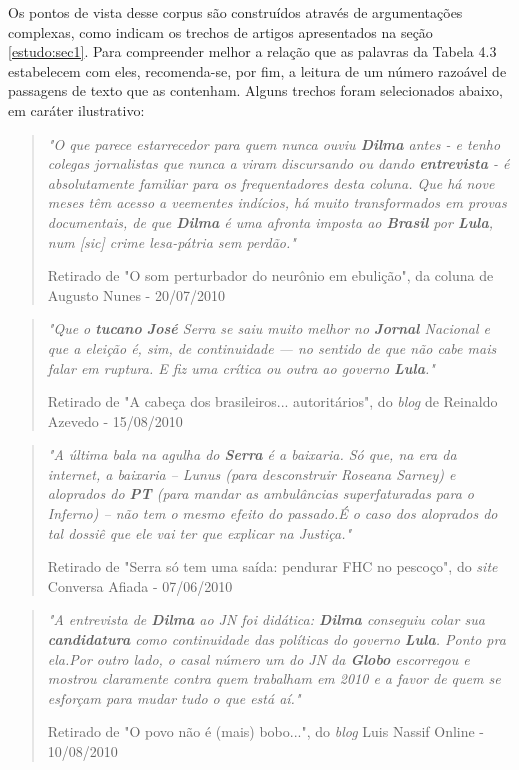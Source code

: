 Os pontos de vista desse corpus são construídos através de argumentações complexas, como indicam os trechos de artigos apresentados na seção \ref{estudo:sec1}. Para compreender melhor a relação que as palavras da Tabela 4.3 estabelecem com eles, recomenda-se, por fim, a leitura de um número razoável de passagens de texto que as contenham. Alguns trechos foram selecionados abaixo, em caráter ilustrativo:

\begin{quote}
\emph{"O que parece estarrecedor para quem nunca ouviu \textbf{Dilma} antes - e tenho colegas jornalistas que nunca a viram discursando ou dando \textbf{entrevista} - é absolutamente familiar para os frequentadores desta coluna. Que há nove meses têm acesso a veementes indícios, há muito transformados em provas documentais, de que \textbf{Dilma} é uma afronta imposta ao \textbf{Brasil} por \textbf{Lula}, num [sic] crime lesa-pátria sem perdão."}

{\small Retirado de "O som perturbador do neurônio em ebulição", da coluna de Augusto Nunes - 20/07/2010}
\end{quote}

\begin{quote}
\emph{"Que o \textbf{tucano} \textbf{José} Serra se saiu muito melhor no \textbf{Jornal} Nacional e que a eleição é, sim, de continuidade — no sentido de que não cabe mais falar em ruptura. E fiz uma crítica ou outra ao governo \textbf{Lula}."}

{\small Retirado de "A cabeça dos brasileiros... autoritários", do \emph{blog} de Reinaldo Azevedo - 15/08/2010}
\end{quote}

\begin{quote}

\emph{"A última bala na agulha do \textbf{Serra} é a baixaria. Só que, na era da internet, a baixaria – Lunus (para desconstruir Roseana Sarney) e aloprados do \textbf{PT} (para mandar as ambulâncias superfaturadas para o Inferno) – não tem o mesmo efeito do passado.É o caso dos aloprados do tal dossiê que ele vai ter que explicar na Justiça."}

{\small Retirado de "Serra só tem uma saída: pendurar FHC no pescoço", do \emph{site} Conversa Afiada - 07/06/2010}
\end{quote}

\begin{quote}
\emph{"A entrevista de \textbf{Dilma} ao JN foi didática: \textbf{Dilma} conseguiu colar sua \textbf{candidatura} como continuidade das políticas do governo \textbf{Lula}. Ponto pra ela.Por outro lado, o casal número um do JN da \textbf{Globo} escorregou e mostrou claramente contra quem trabalham em 2010 e a favor de quem se esforçam para mudar tudo o que está aí."}

{\small Retirado de "O povo não é (mais) bobo...", do \emph{blog} Luis Nassif Online - 10/08/2010}
\end{quote}


